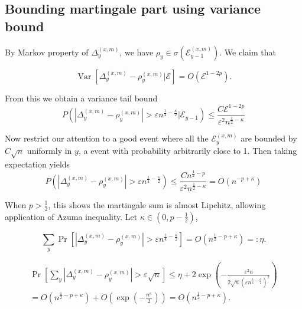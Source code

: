 


\subsection{Bounding martingale part using variance bound}

By Markov property of $\Delta_y^{(x,m)}$, we have $\rho_y \in \sigma\left( \mathcal{E}_{y-1}^{(x,m)} \right) $. We claim that

\[
	\operatorname{Var} \left[ \Delta_y^{(x,m)} - \rho_y^{(x,m)} | \mathcal{E} \right] = O(\mathcal{E}^{1- 2p})
.\] 

From this we obtain a variance tail bound
\[
	P\left( \left| \Delta_y^{(x,m)} - \rho_y^{(x,m)} \right| > \varepsilon n^{\frac{1}{4} - \frac{\kappa}{2}}   | \mathcal{E}_{y - 1} \right)
	\le  \frac{C \mathcal{E}^{1 - 2 p}}{\varepsilon^2 n^{\frac{1}{2} - \kappa}} 
\]

Now restrict our attention to a good event where all the $\mathcal{E}_y^{(x,m)}$ are bounded by $C \sqrt{n}$ uniformly in $y$, a event with probability arbitrarily close to 1. Then taking expectation yields
\[
	P\left( \left| \Delta_y^{(x,m)} - \rho_y^{(x,m)} \right| > \varepsilon n^{\frac{1}{4} - \frac{\kappa}{2}}  \right)
	\le  \frac{C n^{\frac{1}{2} - p}}{\varepsilon^2 n^{\frac{1}{2} - \kappa}} = O(n^{-p + \kappa})
\]

When $p > \frac{1}{2}$, this shows the martingale sum is almost Lipchitz, allowing application of Azuma inequality. Let $\kappa \in (0,p - \frac{1}{2})$,

\[
	\sum_y \operatorname{Pr} \left[ \left| \Delta_y^{(x,m)} - \rho_y^{(x,m)} \right| >  \varepsilon n^{\frac{1}{4} - \frac{\kappa}{2}} \right]
	= O\left( n^{\frac{1}{2} - p + \kappa} \right) 
	=: \eta
.\] 

\begin{multline}
	\operatorname{Pr} \left[ \sum_y  \left| \Delta_y^{(x,m)} - \rho_y^{(x,m)} \right| >  \varepsilon \sqrt{n}  \right]
	\le \eta + 
	2 \exp\left( - \frac{\varepsilon^2 n}{ 2 \sqrt{n} (\varepsilon n^{\frac{1}{4} - \frac{\kappa}{2}})^2 } \right) \\
	= O\left( n^{\frac{1}{2} - p + \kappa} \right) + O\left( \exp\left( - \frac{n^\kappa}{2} \right)  \right)   
	= O\left( n^{\frac{1}{2} - p + \kappa} \right)
	\label{eqn:azuma-bound-1}
.\end{multline} 

